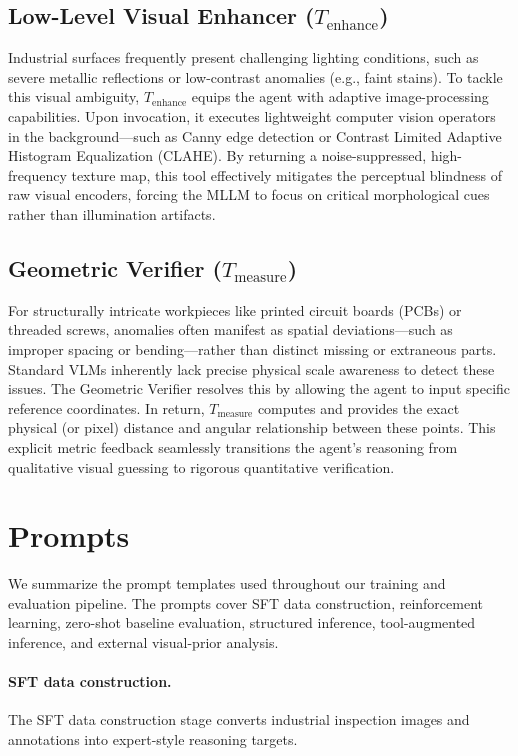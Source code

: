 \documentclass{llmxive}
\begin{document}
{\subsection{Low-Level Visual Enhancer (\texorpdfstring{$T_{\text{enhance}}$}{Tenhance})}
Industrial surfaces frequently present challenging lighting conditions, such as severe metallic reflections or low-contrast anomalies (e.g., faint stains). To tackle this visual ambiguity, $T_{\text{enhance}}$ equips the agent with adaptive image-processing capabilities. Upon invocation, it executes lightweight computer vision operators in the background—such as Canny edge detection or Contrast Limited Adaptive Histogram Equalization (CLAHE). By returning a noise-suppressed, high-frequency texture map, this tool effectively mitigates the perceptual blindness of raw visual encoders, forcing the MLLM to focus on critical morphological cues rather than illumination artifacts.

\subsection{Geometric Verifier (\texorpdfstring{$T_{\text{measure}}$}{Tmeasure})}
For structurally intricate workpieces like printed circuit boards (PCBs) or threaded screws, anomalies often manifest as spatial deviations—such as improper spacing or bending—rather than distinct missing or extraneous parts. Standard VLMs inherently lack precise physical scale awareness to detect these issues. The Geometric Verifier resolves this by allowing the agent to input specific reference coordinates. In return, $T_{\text{measure}}$ computes and provides the exact physical (or pixel) distance and angular relationship between these points. This explicit metric feedback seamlessly transitions the agent's reasoning from qualitative visual guessing to rigorous quantitative verification.




  \section{Prompts}
  \label{appx:prompt}

  We summarize the prompt templates used throughout our training and evaluation pipeline.
  The prompts cover SFT data construction, reinforcement learning, zero-shot baseline
  evaluation, structured inference, tool-augmented inference, and external visual-prior analysis.

  \paragraph{SFT data construction.}
  The SFT data construction stage converts industrial inspection images and annotations into
  expert-style reasoning targets.

}
\end{document}
